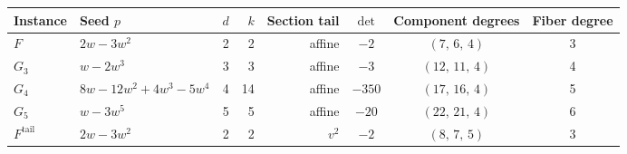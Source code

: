 \begin{tabular}{llrrrccc}
\toprule
Instance & Seed $p$ & $d$ & $k$ & Section tail & $\det$ & Component degrees & Fiber degree \\
\midrule
$F$ & $2w - 3w^{2}$ & 2 & 2 & affine & $-2$ & $(7,\,6,\,4)$ & 3 \\
$G_3$ & $w - 2w^{3}$ & 3 & 3 & affine & $-3$ & $(12,\,11,\,4)$ & 4 \\
$G_4$ & $8w - 12w^{2} + 4w^{3} - 5w^{4}$ & 4 & 14 & affine & $-350$ & $(17,\,16,\,4)$ & 5 \\
$G_5$ & $w - 3w^{5}$ & 5 & 5 & affine & $-20$ & $(22,\,21,\,4)$ & 6 \\
$F^{\mathrm{tail}}$ & $2w - 3w^{2}$ & 2 & 2 & $v^2$ & $-2$ & $(8,\,7,\,5)$ & 3 \\
\bottomrule
\end{tabular}
